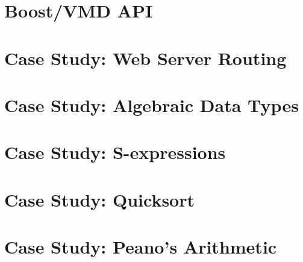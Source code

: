\documentclass[a4paper, 12pt]{book}
\begin{document}
\chapter{Boost/VMD API}
\chapter{Case Study: Web Server Routing}
\chapter{Case Study: Algebraic Data Types}
\chapter{Case Study: S-expressions}
\chapter{Case Study: Quicksort}
\chapter{Case Study: Peano's Arithmetic}
\end{document}
